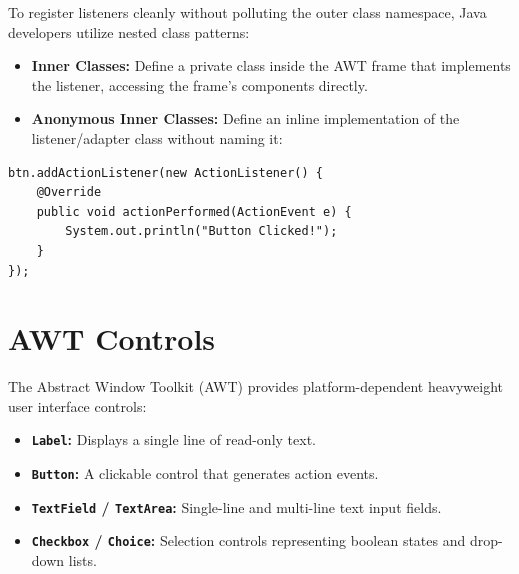 \documentclass[12pt,a4paper]{article}
\begin{document}
To register listeners cleanly without polluting the outer class namespace, Java developers utilize nested class patterns:
\begin{itemize}[leftmargin=*, itemsep=3.5pt]
  \item \textbf{Inner Classes:} Define a private class inside the AWT frame that implements the listener, accessing the frame's components directly.
  \item \textbf{Anonymous Inner Classes:} Define an inline implementation of the listener/adapter class without naming it:
\end{itemize}
\begin{verbatim}
btn.addActionListener(new ActionListener() {
    @Override
    public void actionPerformed(ActionEvent e) {
        System.out.println("Button Clicked!");
    }
});
\end{verbatim}

\section{AWT Controls}

The Abstract Window Toolkit (AWT) provides platform-dependent heavyweight user interface controls:
\begin{itemize}[leftmargin=*, itemsep=3.5pt]
  \item \textbf{\texttt{Label}:} Displays a single line of read-only text.
  \item \textbf{\texttt{Button}:} A clickable control that generates action events.
  \item \textbf{\texttt{TextField} / \texttt{TextArea}:} Single-line and multi-line text input fields.
  \item \textbf{\texttt{Checkbox} / \texttt{Choice}:} Selection controls representing boolean states and drop-down lists.
\end{itemize}

\begin{tcolorbox}[tikzbox, title={AWT Component Class Hierarchy}]
\centering
{}
\end{tcolorbox}
\end{document}
